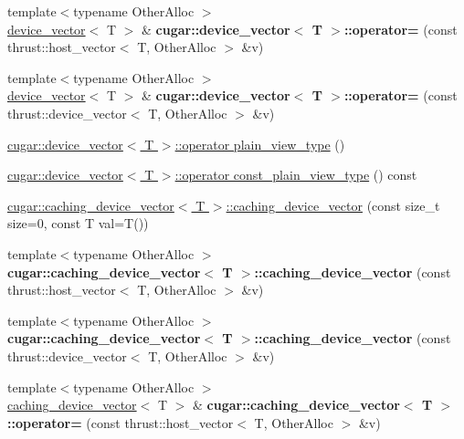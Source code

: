 \begin{DoxyCompactItemize}
\item 
\mbox{\label{group___basic_gaec88c8bc98b3f04aecf8604d82f00557}} 
{\footnotesize template$<$typename Other\+Alloc $>$ }\\\hyperlink{structcugar_1_1device__vector}{device\+\_\+vector}$<$ T $>$ \& {\bfseries cugar\+::device\+\_\+vector$<$ T $>$\+::operator=} (const thrust\+::host\+\_\+vector$<$ T, Other\+Alloc $>$ \&v)
\item 
\mbox{\label{group___basic_ga7b46963606ecaa7ded34a68673cc76ff}} 
{\footnotesize template$<$typename Other\+Alloc $>$ }\\\hyperlink{structcugar_1_1device__vector}{device\+\_\+vector}$<$ T $>$ \& {\bfseries cugar\+::device\+\_\+vector$<$ T $>$\+::operator=} (const thrust\+::device\+\_\+vector$<$ T, Other\+Alloc $>$ \&v)
\item 
\hyperlink{group___basic_gaf23abbba65db2e117920090f0f97ed72}{cugar\+::device\+\_\+vector$<$ T $>$\+::operator plain\+\_\+view\+\_\+type} ()
\item 
\hyperlink{group___basic_ga86ea65d4863bb5e1ed5da63e6355672f}{cugar\+::device\+\_\+vector$<$ T $>$\+::operator const\+\_\+plain\+\_\+view\+\_\+type} () const
\item 
\hyperlink{group___basic_ga2146480a7d6cae513ac29c3ec28a73a3}{cugar\+::caching\+\_\+device\+\_\+vector$<$ T $>$\+::caching\+\_\+device\+\_\+vector} (const size\+\_\+t size=0, const T val=T())
\item 
\mbox{\label{group___basic_ga40498e07b2783844cba65b628aa35958}} 
{\footnotesize template$<$typename Other\+Alloc $>$ }\\{\bfseries cugar\+::caching\+\_\+device\+\_\+vector$<$ T $>$\+::caching\+\_\+device\+\_\+vector} (const thrust\+::host\+\_\+vector$<$ T, Other\+Alloc $>$ \&v)
\item 
\mbox{\label{group___basic_ga291919296948034ad370f778ca0be1da}} 
{\footnotesize template$<$typename Other\+Alloc $>$ }\\{\bfseries cugar\+::caching\+\_\+device\+\_\+vector$<$ T $>$\+::caching\+\_\+device\+\_\+vector} (const thrust\+::device\+\_\+vector$<$ T, Other\+Alloc $>$ \&v)
\item 
\mbox{\label{group___basic_ga3ad5a55799d3611660222072b925ffa1}} 
{\footnotesize template$<$typename Other\+Alloc $>$ }\\\hyperlink{structcugar_1_1caching__device__vector}{caching\+\_\+device\+\_\+vector}$<$ T $>$ \& {\bfseries cugar\+::caching\+\_\+device\+\_\+vector$<$ T $>$\+::operator=} (const thrust\+::host\+\_\+vector$<$ T, Other\+Alloc $>$ \&v)

\end{DoxyCompactItemize}
